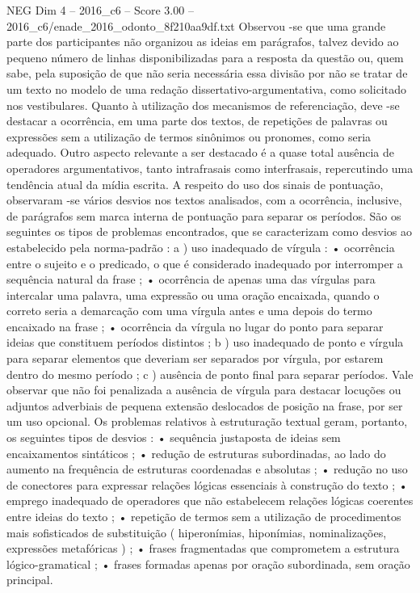 \begin{textsample}{NEG Dim 4 – 2016\_c6 – Score 3.00 – 2016\_c6/enade\_2016\_odonto\_8f210aa9df.txt}
Observou -se que uma grande parte dos participantes não organizou as ideias em parágrafos, talvez devido ao pequeno número de linhas disponibilizadas para a resposta da questão ou, quem sabe, pela suposição de que não seria necessária essa divisão por não se tratar de um texto no modelo de uma redação dissertativo-argumentativa, como solicitado nos vestibulares.
Quanto à utilização dos mecanismos de referenciação, deve -se destacar a ocorrência, em uma parte dos textos, de repetições de palavras ou expressões sem a utilização de termos sinônimos ou pronomes, como seria adequado.
Outro aspecto relevante a ser destacado é a quase total ausência de operadores argumentativos, tanto intrafrasais como interfrasais, repercutindo uma tendência atual da mídia escrita.
A respeito do uso dos sinais de pontuação, observaram -se vários desvios nos textos analisados, com a ocorrência, inclusive, de parágrafos sem marca interna de pontuação para separar os períodos.
São os seguintes os tipos de problemas encontrados, que se caracterizam como desvios ao estabelecido pela norma-padrão : a ) uso inadequado de vírgula : • ocorrência entre o sujeito e o predicado, o que é considerado inadequado por interromper a sequência natural da frase ; • ocorrência de apenas uma das vírgulas para intercalar uma palavra, uma expressão ou uma oração encaixada, quando o correto seria a demarcação com uma vírgula antes e uma depois do termo encaixado na frase ; • ocorrência da vírgula no lugar do ponto para separar ideias que constituem períodos distintos ; b ) uso inadequado de ponto e vírgula para separar elementos que deveriam ser separados por vírgula, por estarem dentro do mesmo período ; c ) ausência de ponto final para separar períodos.
Vale observar que não foi penalizada a ausência de vírgula para destacar locuções ou adjuntos adverbiais de pequena extensão deslocados de posição na frase, por ser um uso opcional.
Os problemas relativos à estruturação textual geram, portanto, os seguintes tipos de desvios : • sequência justaposta de ideias sem encaixamentos sintáticos ; • redução de estruturas subordinadas, ao lado do aumento na frequência de estruturas coordenadas e absolutas ; • redução no uso de conectores para expressar relações lógicas essenciais à construção do texto ; • emprego inadequado de operadores que não estabelecem relações lógicas coerentes entre ideias do texto ; • repetição de termos sem a utilização de procedimentos mais sofisticados de substituição ( hiperonímias, hiponímias, nominalizações, expressões metafóricas ) ; • frases fragmentadas que comprometem a estrutura lógico-gramatical ; • frases formadas apenas por oração subordinada, sem oração principal.

\end{textsample}
